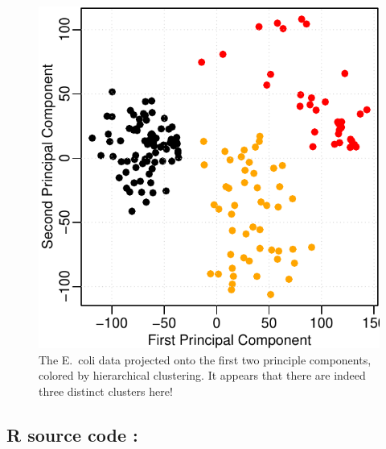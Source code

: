 \begin{multicols*}{2}

\begin{figure}[H]
  \centering
    \includegraphics[width=0.8\linewidth]{images/ecoli_pca.pdf}
  \caption{The E.~coli data projected onto the first two principle components, colored by hierarchical clustering.  It appears that there are indeed three distinct clusters here!}
\end{figure}

\vfill
\columnbreak

\subsection{R source code :}


\end{multicols*}






